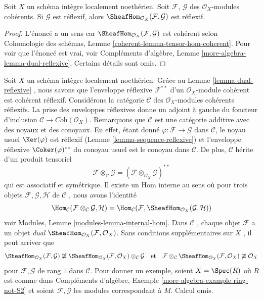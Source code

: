 \begin{lemma}
\label{lemma-dual-reflexive}
Soit  $X$  un schéma intègre localement noethérien. Soit  $\mathcal{F}$,
 $\mathcal{G}$  des  $\mathcal{O}_X$-modules cohérents. Si  $\mathcal{G}$  est réflexif,
alors  $\SheafHom_{\mathcal{O}_X}(\mathcal{F}, \mathcal{G})$  est réflexif.
\end{lemma}

\begin{proof}
L'énoncé a un sens car  $\SheafHom_{\mathcal{O}_X}(\mathcal{F}, \mathcal{G})$  est cohérent selon Cohomologie des schémas,
Lemme  \ref{coherent-lemma-tensor-hom-coherent}. Pour voir que l'énoncé est vrai, voir Compléments d'algèbre, Lemme
 \ref{more-algebra-lemma-dual-reflexive}. Certains détails sont omis.
\end{proof}

\begin{remark}
\label{remark-tensor}
Soit  $X$  un schéma intègre localement noethérien. Grâce au Lemme
 \ref{lemma-dual-reflexive} , nous savons que l'enveloppe réflexive  $\mathcal{F}^{**}$  d’un
 $\mathcal{O}_X$-module cohérent est cohérent réflexif. Considérons la catégorie
 $\mathcal{C}$  des  $\mathcal{O}_X$-modules cohérents réflexifs. La prise des enveloppes
réflexives donne un adjoint à gauche du foncteur d’inclusion  $\mathcal{C} \to \textit{Coh}(\mathcal{O}_X)$.
Remarquons que  $\mathcal{C}$  est une catégorie additive avec des noyaux et des
conoyaux. En effet, étant donné  $\varphi : \mathcal{F} \to \mathcal{G}$  dans  $\mathcal{C}$, le noyau usuel
 $\Ker(\varphi)$  est réflexif (Lemme  \ref{lemma-sequence-reflexive}) et l’enveloppe réflexive
 $\Coker(\varphi)^{**}$  du conoyau usuel est le conoyau dans  $\mathcal{C}$. De plus,
 $\mathcal{C}$  hérite d’un produit tensoriel
$$
\mathcal{F} \otimes_\mathcal{C} \mathcal{G} =
(\mathcal{F} \otimes_{\mathcal{O}_X} \mathcal{G})^{**}
$$
qui est associatif et symétrique. Il existe un Hom interne au sens où pour trois
objets  $\mathcal{F}, \mathcal{G}, \mathcal{H}$  de  $\mathcal{C}$ , nous avons l’identité
$$
\Hom_\mathcal{C}(\mathcal{F} \otimes_\mathcal{C} \mathcal{G}, \mathcal{H}) =
\Hom_\mathcal{C}(\mathcal{F},
\SheafHom_{\mathcal{O}_X}(\mathcal{G}, \mathcal{H}))
$$
voir Modules, Lemme  \ref{modules-lemma-internal-hom}. Dans  $\mathcal{C}$ , chaque objet  $\mathcal{F}$  a
un objet  {\it  dual }   $\SheafHom_{\mathcal{O}_X}(\mathcal{F}, \mathcal{O}_X)$. Sans conditions
supplémentaires sur  $X$ , il peut arriver que
$$
\SheafHom_{\mathcal{O}_X}(\mathcal{F}, \mathcal{G}) \not \cong
\SheafHom_{\mathcal{O}_X}(\mathcal{F}, \mathcal{O}_X)
\otimes_\mathcal{C} \mathcal{G}
\quad\text{et}\quad
\mathcal{F} \otimes_\mathcal{C}
\SheafHom_{\mathcal{O}_X}(\mathcal{F}, \mathcal{O}_X)
\not \cong \mathcal{O}_X
$$
pour  $\mathcal{F}, \mathcal{G}$  de rang  $1$  dans  $\mathcal{C}$. Pour donner un exemple,
soient  $X = \Spec(R)$  où  $R$  est comme dans Compléments d'algèbre, Exemple
 \ref{more-algebra-example-ring-not-S2}  et soient  $\mathcal{F}, \mathcal{G}$  les modules correspondant à  $M$.
Calcul omis.
\end{remark}

